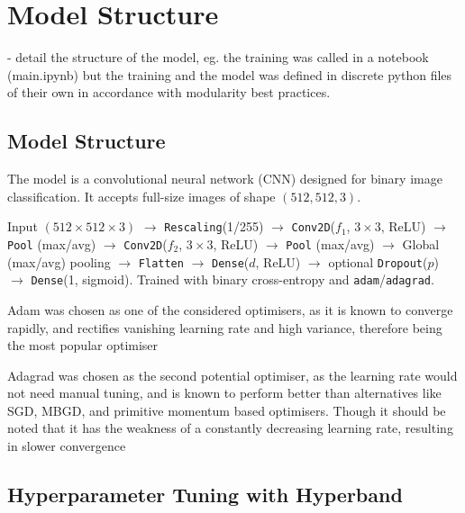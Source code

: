 \section{Model Structure}

- detail the structure of the model, eg. the training was called in a notebook (main.ipynb) but the training and the model was defined in discrete python files of their own in accordance with modularity best practices.

\subsection{Model Structure}

The model is a convolutional neural network (CNN) designed for binary image classification. It accepts full-size images of shape $(512, 512, 3)$.

Input $(512\times 512\times 3)$ $\rightarrow$ \texttt{Rescaling}(1/255) $\rightarrow$ 
\texttt{Conv2D}($f_1$, $3{\times}3$, ReLU) $\rightarrow$ \texttt{Pool} (max/avg) $\rightarrow$
\texttt{Conv2D}($f_2$, $3{\times}3$, ReLU) $\rightarrow$ \texttt{Pool} (max/avg) $\rightarrow$
Global (max/avg) pooling $\rightarrow$ \texttt{Flatten} $\rightarrow$
\texttt{Dense}($d$, ReLU) $\rightarrow$ optional \texttt{Dropout}($p$) $\rightarrow$
\texttt{Dense}(1, sigmoid). Trained with binary cross-entropy and \texttt{adam}/\texttt{adagrad}.

Adam was chosen as one of the considered optimisers, as it is known to converge rapidly, and rectifies vanishing learning rate and high variance, therefore being the most popular optimiser \cite{RAIAAN2024100470}

Adagrad was chosen as the second potential optimiser, as the learning rate would not need manual tuning, and is known to perform better than alternatives like SGD, MBGD, and primitive momentum based optimisers. Though it should be noted that it has the weakness of a constantly decreasing learning rate, resulting in slower convergence \cite{RAIAAN2024100470}



\subsection{Hyperparameter Tuning with Hyperband}

